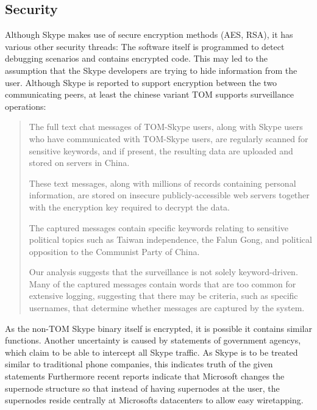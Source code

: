\subsection{Security}
Although Skype makes use of secure encryption methods (AES, RSA), it has
various other security threads: The software itself is programmed to detect
debugging scenarios and contains encrypted code. This may led to the
assumption that the Skype developers are trying to hide information from the
user. Although Skype is reported to support encryption between the two
communicating peers\cite{skype:encrypted}, at least the chinese variant TOM
supports surveillance operations:\cite{skype-tom}
\begin{quote}
The full text chat messages of TOM-Skype users, along with Skype users who have
communicated with TOM-Skype users, are regularly scanned for sensitive keywords, and
if present, the resulting data are uploaded and stored on servers in China.

These text messages, along with millions of records containing personal information, are
stored on insecure publicly-accessible web servers together with the encryption key required to
decrypt the data.

The captured messages contain specific keywords relating to sensitive political topics such
as Taiwan independence, the Falun Gong, and political opposition to the Communist Party
of China.

Our analysis suggests that the surveillance is not solely keyword-driven. Many of the
captured messages contain words that are too common for extensive logging, suggesting
that there may be criteria, such as specific usernames, that determine whether messages are
captured by the system.
\end{quote}
As the non-TOM Skype binary itself is encrypted, it is possible it contains similar
functions.
Another uncertainty is caused by statements of government agencys, which
claim to be able to intercept all Skype traffic. As Skype is to be treated
similar to traditional phone companies, this indicates truth of the given
statements  Furthermore recent reports
indicate that Microsoft changes the supernode structure so that instead of having
supernodes at the user, the supernodes reside centrally at Microsofts
datacenters to allow easy wiretapping.\cite{skype:supernodechange}
